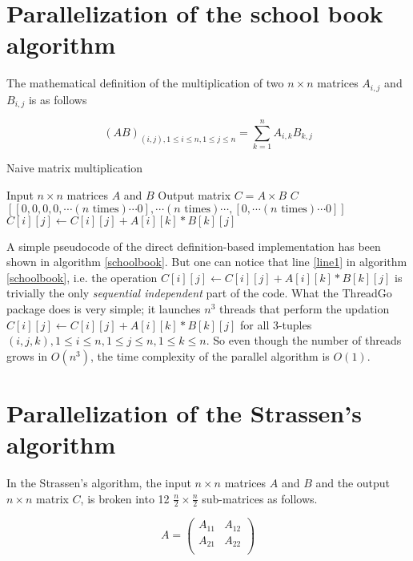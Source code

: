 \documentclass{article}
\begin{document}
\section{Parallelization of the school book algorithm}

The mathematical definition of the multiplication of two $n \times n$ matrices $A_{i,j}$ and $B_{i,j}$ is as follows

\begin{equation}
(AB)_{(i,j),1 \leq i \leq n,1 \leq j \leq n} = \sum_{k=1}^{n} A_{i,k} B_{k,j}
\end{equation}

\begin{algorithm}
\caption{Naive matrix multiplication}
\label{schoolbook}
\begin{algorithmic}
\REQUIRE Input $n \times n$ matrices $A$ and $B$
\ENSURE Output matrix $C = A \times B$
\STATE $C$ \leftarrow $[[0,0,0,0, \cdots (n \text{ times}) \cdots 0],\cdots (n \text{ times}) \cdots,[0, \cdots (n \text{ times}) \cdots 0]]$
$C[i][j] \leftarrow C[i][j] + A[i][k] * B[k][j]$ \label{line1}
\ENDFOR
\ENDFOR
\ENDFOR
\end{algorithmic}
\end{algorithm}

A simple pseudocode of the direct definition-based implementation has been shown in algorithm \ref{schoolbook}. But one can notice that line \ref{line1} in algorithm \ref{schoolbook}, i.e. the operation $C[i][j] \leftarrow C[i][j] + A[i][k] * B[k][j]$ is trivially the only \textit{sequential independent} part of the code. What the ThreadGo package does is very simple; it launches $n^3$ threads that perform the updation $C[i][j] \leftarrow C[i][j] + A[i][k] * B[k][j]$ for all 3-tuples $(i,j,k), 1 \leq i \leq n, 1 \leq j \leq n, 1 \leq k \leq n$. So even though the number of threads grows in $O(n^3)$, the time complexity of the parallel algorithm is $O(1)$.

\section{Parallelization of the Strassen's algorithm}

In the Strassen's algorithm, the input $n \times n$ matrices $A$ and $B$ and the output $n \times n$ matrix $C$, is broken into 12 $\frac{n}{2} \times \frac{n}{2}$ sub-matrices as follows.

\begin{equation}
A = \begin{pmatrix}
A_{11} & A_{12} \\
A_{21} & A_{22} \\
\end{pmatrix}
\end{equation}
\end{document}
